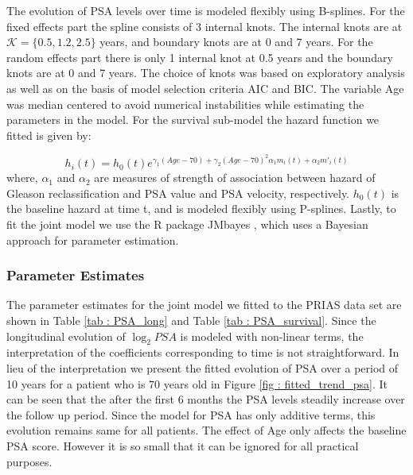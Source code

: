 The evolution of PSA levels over time is modeled flexibly using B-splines. For the fixed effects part the spline consists of 3 internal knots. The internal knots are at $\mathcal{K} =\{0.5, 1.2, 2.5\}$ years, and boundary knots are at 0 and 7 years. For the random effects part there is only 1 internal knot at 0.5 years and the boundary knots are at 0 and 7 years. The choice of knots was based on exploratory analysis as well as on the basis of model selection criteria AIC and BIC. The variable Age was median centered to avoid numerical instabilities while estimating the parameters in the model. For the survival sub-model the hazard function we fitted is given by:

\begin{equation*}
h_i(t) = h_0(t) e^{\gamma_1 (Age-70)  + \gamma_2 (Age-70)^2  \alpha_1 m_i(t) + \alpha_2 m'_i(t)}
\end{equation*}
where, $\alpha_1$ and $\alpha_2$ are measures of strength of association between hazard of Gleason reclassification and PSA value and PSA velocity, respectively. $h_0(t)$ is the baseline hazard at time t, and is modeled flexibly using P-splines\citep{eilers1996flexible}. Lastly, to fit the joint model we use the R package JMbayes \cite{rizopoulosJMbayes}, which uses a Bayesian approach for parameter estimation.

\subsubsection{Parameter Estimates}
\label{subsec : param_estimates_jm_fit_prias}
The parameter estimates for the joint model we fitted to the PRIAS data set are shown in Table \ref{tab : PSA_long} and Table \ref{tab : PSA_survival}. Since the longitudinal evolution of $\log_2 PSA$ is modeled with non-linear terms, the interpretation of the coefficients corresponding to time is not straightforward. In lieu of the interpretation we present the fitted evolution of PSA over a period of 10 years for a patient who is 70 years old in Figure \ref{fig : fitted_trend_psa}. It can be seen that the after the first 6 months the PSA levels steadily increase over the follow up period. Since the model for PSA has only additive terms, this evolution remains same for all patients. The effect of Age only affects the baseline PSA score. However it is so small that it can be ignored for all practical purposes.\\

